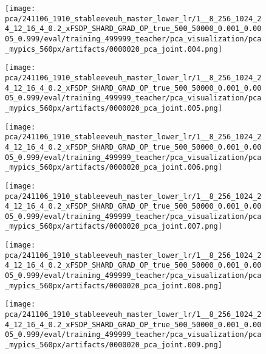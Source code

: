 \begin{figure*}[p]
\begin{subfigure}[t]{0.097\textwidth}
    \end{subfigure}\hfill
    \begin{subfigure}[t]{0.097\textwidth}
        \centering
        \texttt{[image: pca/241106\_1910\_stableeveuh\_master\_lower\_lr/1\_\_8\_256\_1024\_24\_12\_16\_4\_0.2\_xFSDP\_SHARD\_GRAD\_OP\_true\_500\_50000\_0.001\_0.0005\_0.999/eval/training\_499999\_teacher/pca\_visualization/pca\_mypics\_560px/artifacts/0000020\_pca\_joint.004.png]}
    \end{subfigure}\hfill
    \begin{subfigure}[t]{0.097\textwidth}
        \centering
        \texttt{[image: pca/241106\_1910\_stableeveuh\_master\_lower\_lr/1\_\_8\_256\_1024\_24\_12\_16\_4\_0.2\_xFSDP\_SHARD\_GRAD\_OP\_true\_500\_50000\_0.001\_0.0005\_0.999/eval/training\_499999\_teacher/pca\_visualization/pca\_mypics\_560px/artifacts/0000020\_pca\_joint.005.png]}
    \end{subfigure}\hfill
    \begin{subfigure}[t]{0.097\textwidth}
        \centering
        \texttt{[image: pca/241106\_1910\_stableeveuh\_master\_lower\_lr/1\_\_8\_256\_1024\_24\_12\_16\_4\_0.2\_xFSDP\_SHARD\_GRAD\_OP\_true\_500\_50000\_0.001\_0.0005\_0.999/eval/training\_499999\_teacher/pca\_visualization/pca\_mypics\_560px/artifacts/0000020\_pca\_joint.006.png]}
    \end{subfigure}\hfill
    \begin{subfigure}[t]{0.097\textwidth}
        \centering
        \texttt{[image: pca/241106\_1910\_stableeveuh\_master\_lower\_lr/1\_\_8\_256\_1024\_24\_12\_16\_4\_0.2\_xFSDP\_SHARD\_GRAD\_OP\_true\_500\_50000\_0.001\_0.0005\_0.999/eval/training\_499999\_teacher/pca\_visualization/pca\_mypics\_560px/artifacts/0000020\_pca\_joint.007.png]}
    \end{subfigure}\hfill
    \begin{subfigure}[t]{0.097\textwidth}
        \centering
        \texttt{[image: pca/241106\_1910\_stableeveuh\_master\_lower\_lr/1\_\_8\_256\_1024\_24\_12\_16\_4\_0.2\_xFSDP\_SHARD\_GRAD\_OP\_true\_500\_50000\_0.001\_0.0005\_0.999/eval/training\_499999\_teacher/pca\_visualization/pca\_mypics\_560px/artifacts/0000020\_pca\_joint.008.png]}
    \end{subfigure}\hfill
    \begin{subfigure}[t]{0.097\textwidth}
        \centering
        \texttt{[image: pca/241106\_1910\_stableeveuh\_master\_lower\_lr/1\_\_8\_256\_1024\_24\_12\_16\_4\_0.2\_xFSDP\_SHARD\_GRAD\_OP\_true\_500\_50000\_0.001\_0.0005\_0.999/eval/training\_499999\_teacher/pca\_visualization/pca\_mypics\_560px/artifacts/0000020\_pca\_joint.009.png]}

\end{subfigure}
\end{figure*}
